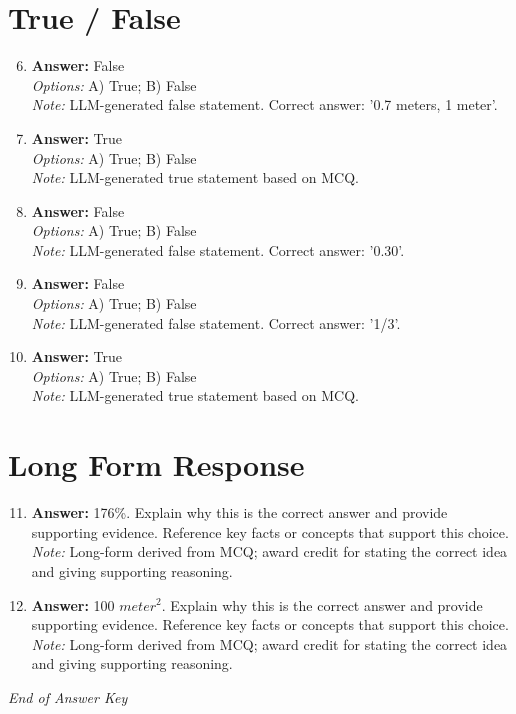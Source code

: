 \documentclass[12pt]{article}
\begin{document}
\section*{True / False}
\begin{enumerate}[label=\arabic*.]
\setcounter{enumi}{5}
\item \textbf{Answer:} False
\\ \textit{Options:} A) True; B) False
\\ \textit{Note:} LLM-generated false statement. Correct answer: '0.7 meters, 1 meter'.
\item \textbf{Answer:} True
\\ \textit{Options:} A) True; B) False
\\ \textit{Note:} LLM-generated true statement based on MCQ.
\item \textbf{Answer:} False
\\ \textit{Options:} A) True; B) False
\\ \textit{Note:} LLM-generated false statement. Correct answer: '0.30'.
\item \textbf{Answer:} False
\\ \textit{Options:} A) True; B) False
\\ \textit{Note:} LLM-generated false statement. Correct answer: '1/3'.
\item \textbf{Answer:} True
\\ \textit{Options:} A) True; B) False
\\ \textit{Note:} LLM-generated true statement based on MCQ.
\end{enumerate}

\section*{Long Form Response}
\begin{enumerate}[label=\arabic*.]
\setcounter{enumi}{10}
\item \textbf{Answer:} 176\%. Explain why this is the correct answer and provide supporting evidence. Reference key facts or concepts that support this choice.
\\ \textit{Note:} Long-form derived from MCQ; award credit for stating the correct idea and giving supporting reasoning.
\item \textbf{Answer:} 100 $meter^2$. Explain why this is the correct answer and provide supporting evidence. Reference key facts or concepts that support this choice.
\\ \textit{Note:} Long-form derived from MCQ; award credit for stating the correct idea and giving supporting reasoning.
\end{enumerate}

\vfill
\noindent\textit{End of Answer Key}
\end{document}
